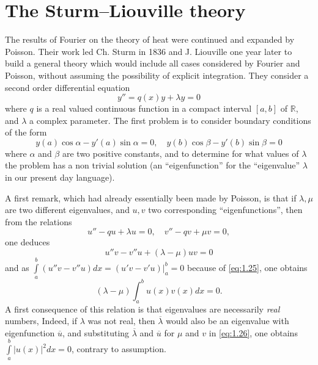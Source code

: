 \documentclass[12pt,a4paper,leqno,twoside]{extbook}
\newcommand{\R}{\mathbb{R}}
\begin{document}
\section{The Sturm--Liouville theory}
\label{sec:1.3}

The results of Fourier on the theory of heat were continued and expanded by Poisson. Their work led Ch. Sturm in 1836 and J. Liouville one year later to build a general theory which would include all cases considered by Fourier and Poisson, without assuming the possibility of explicit integration. They consider a second order differential equation
\begin{equation}
    \label{eq:1.24}
    y'' = q(x)y + \lambda y = 0
\end{equation}
where \(q\) is a real valued continuous function in a compact interval \([a,b]\) of \(\R\), and \(\lambda\) a complex parameter. The first problem is to consider boundary conditions of the form
\begin{equation}
    \label{eq:1.25}
    y(a)\cos\alpha - y'(a)\sin\alpha = 0, \quad y(b)\cos\beta - y'(b)\sin\beta = 0
\end{equation}
where \(\alpha\) and \(\beta\) are two positive constants, and to determine for what values of \(\lambda\) the problem has a non trivial solution (an ``eigenfunction'' for the ``eigenvalue'' \(\lambda\) in our present day language).

A first remark, which had already essentially been made by Poisson, is that if \(\lambda, \mu\) are two different eigenvalues, and \(u, v\) two corresponding ``eigenfunctions'', then from the relations
\[
    u'' - qu + \lambda u = 0, \quad v'' - qv + \mu v = 0,
\]
one deduces
\[
    u'' v - v'' u + (\lambda - \mu) uv = 0
\]
and as \(\int\limits_a^b \left(u'' v - v'' u\right)dx = (u'v - v'u)\rvert_a^b = 0\) because of \eqref{eq:1.25}, one obtains
\begin{equation}
    \label{eq:1.26}
    (\lambda - \mu) \int_a^b u(x)v(x)dx = 0.
\end{equation}
A first consequence of this relation is that eigenvalues are necessarily \emph{real} numbers, Indeed, if \(\lambda\) was not real, then \(\overline\lambda\) would also be an eigenvalue with eigenfunction \(\overline{u}\), and substituting \(\overline\lambda\) and \(\overline{u}\) for \(\mu\) and \(v\) in \eqref{eq:1.26}, one obtains \(\int\limits_a^b |u(x)|^2 dx = 0\), contrary to assumption.
\end{document}
